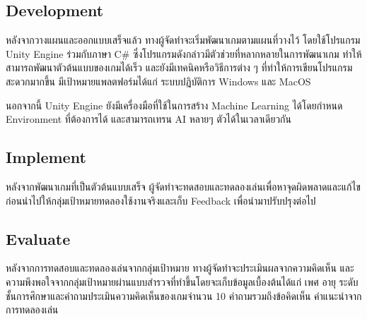 \documentclass[12pt,oneside,openright,a4paper]{cpe-thai-project}
\begin{document}
\subsection{Development}
หลังจากวางแผนและออกแบบเสร็จแล้ว ทางผู้จัดทำจะเริ่มพัฒนาเกมตามแผนที่วางไว้ 
โดยใช้โปรแกรม Unity Engine ร่วมกับภาษา C\# ซึ่งโปรแกรมดังกล่าวมีตัวช่วยที่หลากหลายในการพัฒนาเกม 
ทำให้สามารถพัฒนาตัวต้นแบบของเกมได้เร็ว และยังมีเทคนิคหรือวิธีการต่าง ๆ ที่ทำให้การเขียนโปรแกรมสะดวกมากขึ้น 
มีเป้าหมายแพลตฟอร์มได้แก่ ระบบปฏิบัติการ Windows และ MacOS

นอกจากนี้ Unity Engine ยังมีเครื่องมือที่ใช้ในการสร้าง Machine Learning ได้โดยกำหนด Environment ที่ต้องการได้ 
และสามารถเทรน AI หลายๆ ตัวได้ในเวลาเดียวกัน


\subsection{Implement}
หลังจากพัฒนาเกมที่เป็นตัวต้นแบบเสร็จ ผู้จัดทำจะทดสอบและทดลองเล่นเพื่อหาจุดผิดพลาดและแก้ไข 
ก่อนนำไปให้กลุ่มเป้าหมายทดลองใช้งานจริงและเก็บ Feedback เพื่อนำมาปรับปรุงต่อไป

\subsection{Evaluate}

หลังจากการทดสอบและทดลองเล่นจากกลุ่มเป้าหมาย ทางผู้จัดทำจะประเมินผลจากความคิดเห็น
และความพึงพอใจจากกลุ่มเป้าหมายผ่านแบบสำรวจที่ทำขึ้นโดยจะเก็บข้อมูลเบื้องต้นได้แก่ เพศ อายุ 
ระดับชั้นการศึกษาและคำถามประเมินความคิดเห็นของเกมจำนวน 10 คำถามรวมถึงข้อคิดเห็น คำแนะนำจากการทดลองเล่น




\end{document}
